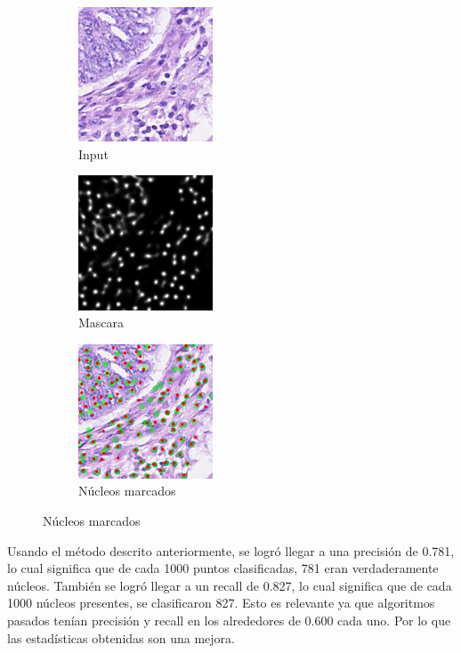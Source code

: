 \documentclass[12pt, letterpaper]{article}
\begin{document}
\begin{figure}[h]
	\begin{subfigure}{.3\textwidth}
		\centering
		\includegraphics[width=4cm]{a-sirinukunwattanaLocalitySensitiveDeep2016.png}
		\caption{Input}
	\end{subfigure}
	\begin{subfigure}{.3\textwidth}
		\centering
		\includegraphics[width=4cm]{b-sirinukunwattanaLocalitySensitiveDeep2016.png}
		\caption{Mascara}
	\end{subfigure}
	\begin{subfigure}{.3\textwidth}
		\centering
		\includegraphics[width=4cm]{c-sirinukunwattanaLocalitySensitiveDeep2016.png}
		\caption{Núcleos marcados}
	\end{subfigure}
\end{figure}

Usando el método descrito anteriormente, se logró llegar a una precisión de 0.781, lo cual significa que de cada 1000 puntos clasificadas, 781 eran verdaderamente núcleos. También se logró llegar a un recall de 0.827, lo cual significa que de cada 1000 núcleos presentes, se clasificaron 827. Esto es relevante ya que algoritmos pasados tenían precisión y recall en los alrededores de 0.600 cada uno. Por lo que las estadísticas obtenidas son una mejora.
\end{document}
